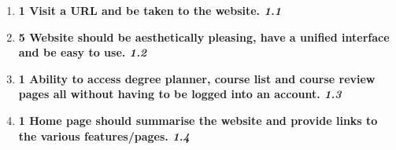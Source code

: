 \documentclass[12pt,titlepage]{article}
\newenvironment{storyPoint}
   {\color{blue} \bfseries}
   {}
\newenvironment{storyId}
   {\color{Bittersweet} \itshape}
   {}
\begin{document}
\newcommand{\storyOnePointOne}{
   \begin{storyPoint}1\end{storyPoint}
   Visit a URL and be taken to the website.
   \begin{storyId}1.1\end{storyId}
}
\newcommand{\storyOnePointTwo}{
   \begin{storyPoint}5\end{storyPoint}
   Website should be aesthetically pleasing, have a unified interface and be
   easy to use.
   \begin{storyId}1.2\end{storyId}
}
\newcommand{\storyOnePointThree}{
   \begin{storyPoint}1\end{storyPoint}
   Ability to access degree planner, course list and course review pages all
   without having to be logged into an account.
   \begin{storyId}1.3\end{storyId}
}
\newcommand{\storyOnePointFour}{
   \begin{storyPoint}1\end{storyPoint} 
   Home page should summarise the website and provide links to the various
   features/pages.
   \begin{storyId}1.4\end{storyId}
}

\begin{enumerate}
   \item \storyOnePointOne{}
   \item \storyOnePointTwo{}
   \item \storyOnePointThree{}
   \item \storyOnePointFour{}
\end{enumerate}

\subsection{\epicTwo{}}

\newcommand{\storyTwoPointOne}{
   \begin{storyPoint}1\end{storyPoint}
   Degree planner page should be accessible from all pages.
   \begin{storyId}2.1\end{storyId}
}
\newcommand{\storyTwoPointTwo}{
   \begin{storyPoint}2\end{storyPoint}
   First degree planner page should present me with a list of CSE degrees to
   choose from.
   \begin{storyId}2.2\end{storyId}
}
\newcommand{\storyTwoPointThree}{
   \begin{storyPoint}3\end{storyPoint}
   I should be able to view all the degrees at once, or filtered degrees by
   letter, or filtered degrees by faculty.
   \begin{storyId}2.3\end{storyId}
}
\end{document}
